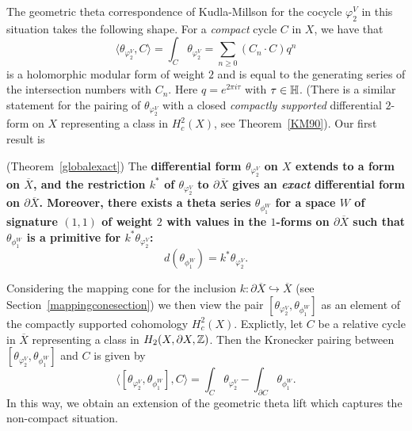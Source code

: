 The geometric theta correspondence of Kudla-Millson \cite{KM90} for the cocycle $\varphi^V_{2}$ in this situation takes the following shape. For a {\it compact} cycle $C$ in $X$, we have that 
\begin{equation}\label{KM-id}
\langle \theta_{\varphi^V_{2}}, C \rangle =  \int_C  \theta_{\varphi^V_{2}}= \sum_{n \geq 0} (C_n \cdot C) q^n
\end{equation}
is a holomorphic modular form of weight $2$ and is equal to the generating series of the  intersection numbers with $C_n$. Here $q = e^{2\pi i \tau}$ with $\tau \in \mathbb{H}$. 
(There is a similar statement for the pairing of $\theta_{\varphi^V_{2}}$ with a closed {\it compactly supported} differential $2$-form on ${X}$ representing a class in $H^2_c(X)$, see Theorem~\ref{KM90}). Our first result is 

\begin{theorem}\label{FM-boundaryexact}  (Theorem~\ref{globalexact})
The \bf{differential form} $\theta_{\varphi^V_{2}}$ on $X$ extends to a form on $\overline{X}$, and the restriction $k^{\ast}$ of $\theta_{\varphi^V_{2}}$ to $\partial \overline{X}$ gives an {\it exact} differential form on $\partial\overline{X}$. Moreover, there exists a theta series $\theta_{\phi_1^W}$ for a space $W$ of signature $(1,1)$  of weight $2$ with values in the $1$-forms on $\partial \overline{X}$ such that $\theta_{\phi_1^W}$ is a primitive for $k^{\ast} \theta_{\varphi^V_{2}}$:
\[
d (\theta_{\phi_1^W}) = k^{\ast} \theta_{\varphi^V_{2}}.
\]
\end{theorem}

Considering the mapping cone for the inclusion $k: \partial \overline{X} \hookrightarrow \overline{X}$ (see Section~\ref{mappingconesection}) we then view the pair $[\theta_{\varphi^V_{2}}, \theta_{\phi_1^W}]$ as an element of the compactly supported cohomology $H^2_c(X)$. Explictly, let $C$ be a relative cycle in $\overline{X}$ representing a class in $H_2({X},\partial {X},\mathbb{Z})$. Then the Kronecker pairing between $[\theta_{\varphi^V_{2}}, \theta_{\phi_1^W}]$ and $C$ is given by
\begin{equation}\label{mappingconelift}
\langle [\theta_{\varphi^V_{2}}, \theta_{\phi_1^W}], C \rangle = \int_C  \theta_{\varphi^V_{2}}
 - \int_{\partial C} \theta_{\phi_1^W}.
\end{equation}
In this way, we obtain an extension of the geometric theta lift which captures the non-compact situation.

